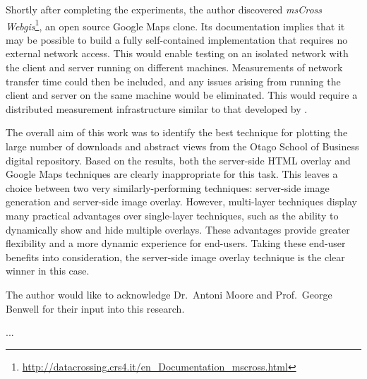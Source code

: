 \documentclass[acmnow]{acmtrans2m}
\begin{document}
Shortly after completing the experiments, the author discovered
\emph{msCross Web\-gis}\footnote{\url{http://datacrossing.crs4.it/en_Documentation_mscross.html}},
an open source Google Maps clone. Its documentation implies that it may
be possible to build a fully self-contained implementation that requires
no external network access. This would enable testing on an isolated
network with the client and server running on different machines.
Measurements of network transfer time could then be included, and any
issues arising from running the client and server on the same machine
would be eliminated. This would require a distributed measurement
infrastructure similar to that developed by .

The overall aim of this work was to identify the best technique for
plotting the large number of downloads and abstract views from the Otago
School of Business digital repository. Based on the results, both the
server-side HTML overlay and Google Maps techniques are clearly
inappropriate for this task. This leaves a choice between two very
similarly-performing techniques: server-side image generation and
server-side image overlay. However, multi-layer techniques display many
practical advantages over single-layer techniques, such as the ability
to dynamically show and hide multiple overlays. These advantages provide
greater flexibility and a more dynamic experience for end-users. Taking
these end-user benefits into consideration, the server-side image
overlay technique is the clear winner in this case.


\begin{acks}
The author would like to acknowledge Dr.\ Antoni Moore and Prof.\ George
Benwell for their input into this research.
\end{acks}





\begin{received}
...
\end{received}
\end{document}
